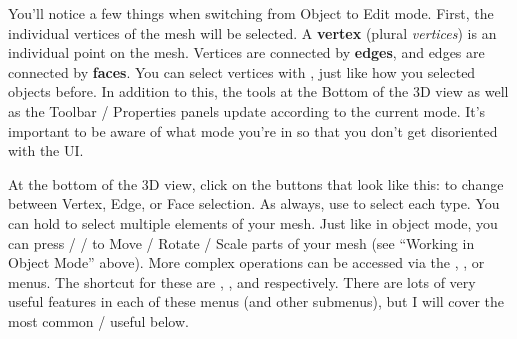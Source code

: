 \documentclass[11pt]{article}
\begin{document}
You'll notice a few things when switching from Object to Edit mode.  First, the individual vertices
of the mesh will be selected.  A \textbf{vertex} (plural \textit{vertices}) is an individual point
on the mesh.  Vertices are connected by \textbf{edges}, and edges are connected by \textbf{faces}.
You can select vertices with , just like how you selected objects before.
In addition to this, the tools at the Bottom of the 3D view as well as the Toolbar / Properties
panels update according to the current mode.  It's important to be aware of what mode you're in so
that you don't get disoriented with the UI.

At the bottom of the 3D view, click on the buttons that look like this:  
 to change between Vertex,
Edge, or Face selection.  As always, use  to select each type.  You can
hold  to select multiple elements of your mesh.  Just like in object mode, you can
press  /  /  to Move / Rotate / Scale parts of your mesh (see ``Working in
Object Mode'' above).  More complex operations can be accessed via the ,
, or  menus.  The shortcut for these are ,
, and  respectively.  There are lots of very useful features in each of
these menus (and other submenus), but I will cover the most common / useful below.
\end{document}
